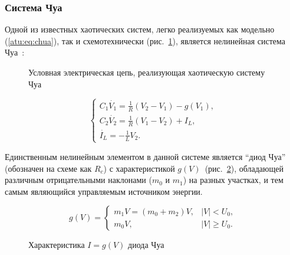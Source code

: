 
\FloatBarrier
\subsubsection{Система Чуа} %


Одной из известных хаотических систем, легко реализуемых как модельно (\ref{atu:eq:chua}),
так и схемотехнически (рис.~\ref{atu:f:chuascheme}),
является нелинейная система Чуа~\cite{moon_chaotic_vibr,buga_chua}:

\begin{figure}[htb!]
\begin{center}

\end{center}
\caption{Условная электрическая цепь, реализующая хаотическую систему Чуа}
\label{atu:f:chuascheme}
\end{figure}


\begin{equation}
\begin{cases}
  C_1 \dot{V_1}  = \frac{1}{R} ( V_2 - V_1 ) - g(V_1), \\
  C_2 \dot{V_2}  = \frac{1}{R} ( V_1 - V_2 ) + I_L, \\
  \dot{I_L}      = - \frac{1}{L} V_2 .
\end{cases}
\label{atu:eq:chua}
\end{equation}

Единственным нелинейным элементом в данной системе является ``диод Чуа''
(обозначен на схеме как $R_c$) с
характеристикой $g(V)$~(рис.~\ref{atu:f:diodchua}),
обладающей различным отрицательными наклонами
($m_0$ и $m_1$) на разных участках,
и тем самым являющийся управляемым источником энергии.


\begin{equation}
g(V) =
\begin{cases}
  m_1 V = ( m_0 + m_2 ) V , & |V| <   U_0, \\
  m_0 V ,                   & |V| \ge U_0.
\end{cases}
\label{atu:eq:diodchua}
\end{equation}

\begin{figure}[htb!]
\begin{center}

\end{center}
\caption{Характеристика \(I=g(V)\) диода Чуа}
\label{atu:f:diodchua}
\end{figure}


